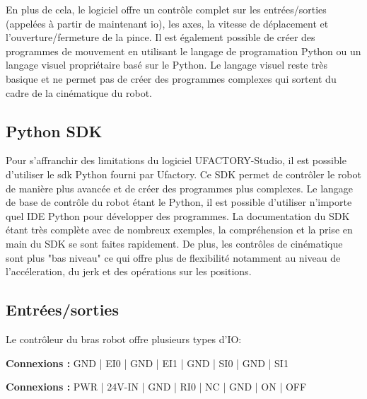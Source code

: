 En plus de cela, le logiciel offre un contrôle complet sur les entrées/sorties (appelées à partir de maintenant \gls{io}), les axes, la vitesse de déplacement et l'ouverture/fermeture de la pince. Il est également possible de créer des programmes de mouvement en utilisant le langage  de programation Python ou un langage visuel propriétaire basé sur le Python. Le langage visuel reste très basique et ne permet pas de créer des programmes complexes qui sortent du cadre de la cinématique du robot.

\subsection{Python SDK}
Pour s'affranchir des limitations du logiciel UFACTORY-Studio, il est possible d'utiliser le \gls{sdk} Python \cite{PythonSDK} fourni par Ufactory. Ce SDK permet de contrôler le robot de manière plus avancée et de créer des programmes plus complexes. Le langage de base de contrôle du robot étant le Python, il est possible d'utiliser n'importe quel IDE Python pour développer des programmes. La documentation du SDK étant très complète avec de nombreux exemples, la compréhension et la prise en main du SDK se sont faites rapidement. De plus, les contrôles de cinématique sont plus "bas niveau" ce qui offre plus de flexibilité notamment au niveau de l'accéleration, du \gls{jerk} et des opérations sur les positions.

\subsection{Entrées/sorties}
Le contrôleur du bras robot offre plusieurs types d'IO:


\begin{tcolorbox}[colframe=black, colback=SafetyColor, title=Safety]
    \textbf{Connexions :} GND | EI0 | GND | EI1 | GND | SI0 | GND | SI1
\end{tcolorbox}

\begin{tcolorbox}[colframe=black, colback=PowerColor, title=Power]
    \textbf{Connexions :} PWR | 24V-IN | GND | RI0 | NC | GND | ON | OFF
\end{tcolorbox}

